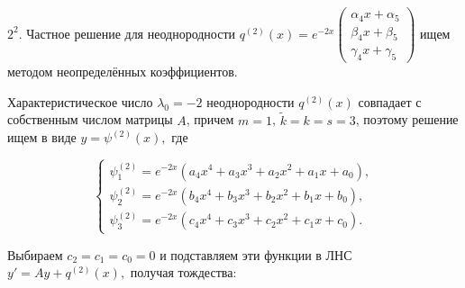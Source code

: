 \documentclass[11pt]{article}
\begin{document}
{%


\smallskip
$2^2.$ Частное решение для неоднородности $q^{(2)}(x) = e^{-2x} \begin{pmatrix} \alpha_4 x + \alpha_5 \\ \beta_4 x + \beta_5 \\ \gamma_4 x + \gamma_5 \end{pmatrix}$ ищем методом неопределённых коэффициентов.

Характеристическое число $\lambda_0 = -2$ неоднородности $q^{(2)}(x)$ совпадает с собственным числом матрицы $A$, причем $m=1$, $\tilde{k} = k = s = 3$, поэтому решение ищем в виде $y=\psi^{(2)}(x),$ где

\[
\begin{cases}
\psi_1^{(2)} = e^{-2x} (a_4 x^4 + a_3 x^3 + a_2 x^2 + a_1 x + a_0), \\
\psi_2^{(2)} = e^{-2x} (b_4 x^4 + b_3 x^3 + b_2 x^2 + b_1 x + b_0), \\
\psi_3^{(2)} = e^{-2x} (c_4 x^4 + c_3 x^3 + c_2 x^2 + c_1 x + c_0).
\end{cases}
\]

Выбираем $c_2 = c_1 = c_0 = 0$ и подставляем эти функции в ЛНС $y'=Ay+q^{(2)}(x),$ получая тождества:

}
\end{document}
